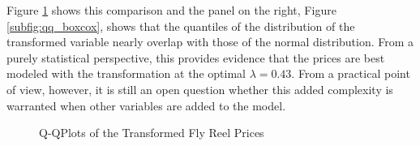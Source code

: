 \documentclass[11pt]{book}
\begin{document}
Figure \ref{fig:qq_prices} shows this comparison
and the panel on the right, Figure \ref{subfig:qq_boxcox}, 
shows that the quantiles of the distribution of the transformed variable
nearly overlap with those of the normal distribution.
From a purely statistical perspective, 
this provides evidence that the prices are best modeled with the transformation
at the optimal $\lambda = 0.43$.
From a practical point of view, however, 
it is still an open question whether this 
added complexity is warranted when other variables are added to the model. 


\begin{figure}[!ht]
\hfill
{}

\caption{Q-QPlots of the Transformed Fly Reel Prices}
\label{fig:qq_prices}
\end{figure}








\end{document}
